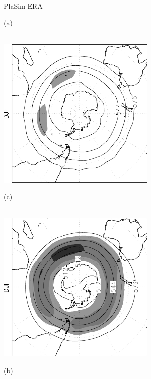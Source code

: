 \documentclass[12pt,a4paper,twoside,openright,headinclude,liststotoc,bibtotoc]{scrreprt}
\begin{document}
\begin{figure}[b]
\hspace{3.1cm}PlaSim \vspace{-0.1cm} \hspace{7.3cm} ERA \\
\parbox{8.5cm}{\hspace{0.02cm}\begin{scriptsize}(a)\end{scriptsize} \vspace{-0.3cm} \\
\includegraphics[height=7.5cm,angle=-90]
{eps/SHz500StdbpDJF.eps}
}
\parbox{8.5cm}{\hspace{0.02cm}\begin{scriptsize}(c)\end{scriptsize} \vspace{-0.3cm} \\
\includegraphics[height=7.5cm,angle=-90]
{eps/SHt21z500StdbpDJF.eps}
}
\parbox{8.5cm}{\hspace{0.02cm}\begin{scriptsize}(b)\end{scriptsize} \vspace{-0.3cm} \\
}
\end{figure}
\end{document}
